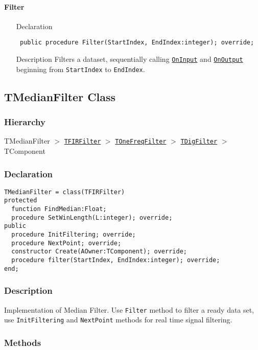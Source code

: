 \documentclass[12pt,a4paper,oneside]{report}
\newcommand{\declarationitem}[1]{{\addfontfeatures{FakeSlant} #1}}
\newcommand{\descriptiontitle}[1]{{\addfontfeatures{FakeSlant}#1}}
\newcommand{\code}[1]{\texttt{#1}}
\begin{document}
\paragraph{Filter}
\label{lmfilters.TGaussFilter-Filter}
\begin{itemize}\item[\declarationitem{Declaration}\hfill]
	\begin{flushleft}
		\code{
			public procedure Filter(StartIndex, EndIndex:integer); override;}
	\end{flushleft}
\item[\descriptiontitle{Description}] Filters a dataset, sequentially calling \hyperref[lmfilters.TDigFilter-OnInput]{\code{OnInput}} and \hyperref[lmfilters.TDigFilter-OnOutput]{\code{OnOutput}} beginning from \code{StartIndex} to \code{EndIndex}.
\end{itemize}
\subsection{TMedianFilter Class}
\label{lmfilters.TMedianFilter}
\subsubsection{Hierarchy}
TMedianFilter {$>$} \hyperref[lmfilters.TFIRFilter]{\code{TFIRFilter}} {$>$} \hyperref[lmfilters.TOneFreqFilter]{\code{TOneFreqFilter}} {$>$} \hyperref[lmfilters.TDigFilter]{\code{TDigFilter}} {$>$} TComponent
\subsubsection{Declaration}
\begin{verbatim}
TMedianFilter = class(TFIRFilter)
protected
  function FindMedian:Float;
  procedure SetWinLength(L:integer); override;
public
  procedure InitFiltering; override;
  procedure NextPoint; override;
  constructor Create(AOwner:TComponent); override;
  procedure filter(StartIndex, EndIndex:integer); override;
end;
\end{verbatim}
\subsubsection{Description}
Implementation of Median Filter. Use \code{Filter} method to filter a ready data set, use \code{InitFiltering} and \code{NextPoint} methods for real time signal filtering.
\subsubsection{Methods}
\end{document}
